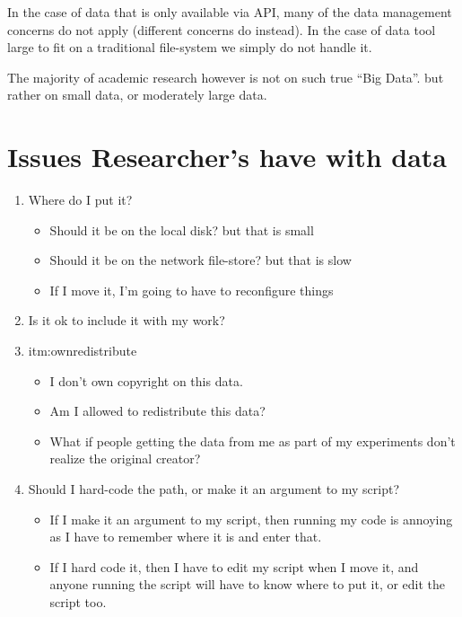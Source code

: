 \documentclass[]{article}
\begin{document}
In the case of data that is only available via API, many of the data management concerns do not apply (different concerns do instead).
In the case of data tool large to fit on a traditional file-system we simply do not handle it.

The majority of academic research however is not on such true ``Big Data''.
but rather on small data, or moderately large data.


\section{Issues Researcher's have with data}
\begin{enumerate}
	\item Where do I put it? \label{itm:where}
	\begin{itemize}
		\item Should it be on the local disk? but that is small
		\item Should it be on the network file-store? but that is slow
		\item If I move it, I'm going to have to reconfigure things
	\end{itemize}
	\item Is it ok to include it with my work? \item{itm:ownredistribute}
	\begin{itemize}
		\item I don't own copyright on this data.
		\item Am I allowed to redistribute this data?
		\item What if people getting the data from me as part of my experiments don't realize the original creator?
	\end{itemize}
	\item Should I hard-code the path, or make it an argument to my script? \label{itm:path}
	\begin{itemize}
		\item If I make it an argument to my script, then running my code is annoying as I have to remember where it is and enter that.
		\item If I hard code it, then I have to edit my script when I move it, and anyone running the script will have to know where to put it, or edit the script too.
	\end{itemize}
\end{enumerate}
\end{document}
